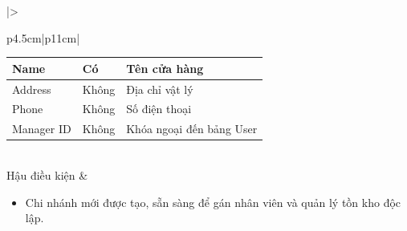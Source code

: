 \documentclass[12pt,a4paper]{report}
\begin{document}
\begin{longtable}{|>{\raggedright\arraybackslash\bfseries}p{4.5cm}|p{11cm}|}
\begin{tabular}{|p{3.5cm}|p{2.5cm}|p{4cm}|}
Name & Có & Tên cửa hàng \\ \hline
Address & Không & Địa chỉ vật lý \\ \hline
Phone & Không & Số điện thoại \\ \hline
Manager ID & Không & Khóa ngoại đến bảng User \\ \hline
\end{tabular} \\ \hline
Hậu điều kiện & 
\begin{itemize}[leftmargin=*, nosep, topsep=0pt, partopsep=0pt]
    \item Chi nhánh mới được tạo, sẵn sàng để gán nhân viên và quản lý tồn kho độc lập.
\end{itemize} \\ \hline
\end{longtable}

\vspace{0.5cm}
\end{document}
